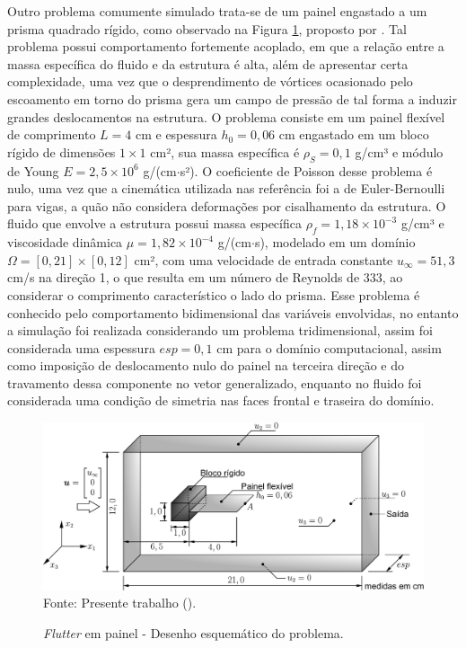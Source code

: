 Outro problema comumente simulado trata-se de um painel engastado a um prisma quadrado rígido, como observado na Figura \ref{fig:FSI-prism}, proposto por . Tal problema possui comportamento fortemente acoplado, em que a relação entre a massa específica do fluido e da estrutura é alta, além de apresentar certa complexidade, uma vez que o desprendimento de vórtices ocasionado pelo escoamento em torno do prisma gera um campo de pressão de tal forma a induzir grandes deslocamentos na estrutura. O problema consiste em um painel flexível de comprimento $L=4$ cm e espessura $h_0=0,06$ cm engastado em um bloco rígido de dimensões $1\times 1$ cm², sua massa específica é $\rho_S=0,1$ g/cm³ e módulo de Young $E=2,5\times 10^6$ g/(cm$\cdot$s²). O coeficiente de Poisson desse problema é nulo, uma vez que a cinemática utilizada nas referência foi a de Euler-Bernoulli para vigas, a quão não considera deformações por cisalhamento da estrutura. O fluido que envolve a estrutura possui massa específica $\rho_f=1,18\times10^{-3}$ g/cm³ e viscosidade dinâmica $\mu=1,82\times10^{-4}$ g/(cm$\cdot$s), modelado em um domínio $\Omega=[0,21]\times[0,12]$ cm², com uma velocidade de entrada constante $u_\infty=51,3$ cm/s na direção 1, o que resulta em um número de Reynolds de $333$, ao considerar o comprimento característico o lado do prisma. Esse problema é conhecido pelo comportamento bidimensional das variáveis envolvidas, no entanto a simulação foi realizada considerando um problema tridimensional, assim foi considerada uma espessura $esp=0,1$ cm para o domínio computacional, assim como imposição de deslocamento nulo do painel na terceira direção e do travamento dessa componente no vetor generalizado, enquanto no fluido foi considerada uma condição de simetria nas faces frontal e traseira do domínio.

\begin{figure}[h!]
    \centering
    \caption{\textit{Flutter} em painel - Desenho esquemático do problema.}
    \includegraphics[width=\linewidth]{Figuras/FSI-prism/FSI-prism3D.pdf}
    \\Fonte: Presente trabalho (\the\year).
    \label{fig:FSI-prism}
\end{figure}

